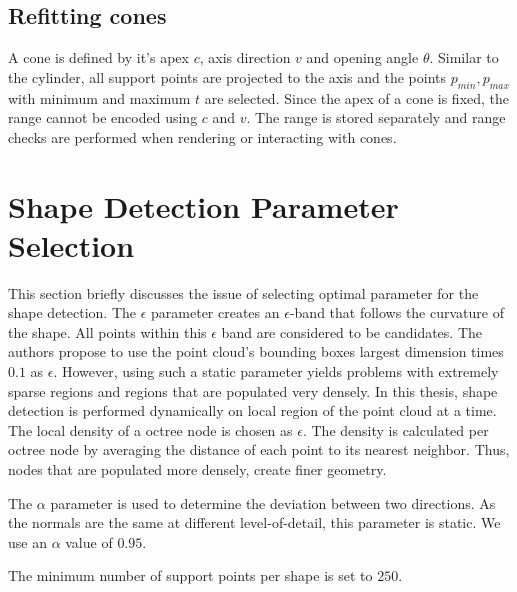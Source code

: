 \subsection{Refitting cones}

A cone is defined by it's apex $c$, axis direction $v$ and opening angle $\theta$. Similar to the cylinder, all support points are projected to the axis and the points $p_{min}, p_{max}$ with minimum and maximum $t$ are selected. Since the apex of a cone is fixed, the range cannot be encoded using $c$ and $v$. The range is stored separately and range checks are performed when rendering or interacting with cones. 


\section{Shape Detection Parameter Selection}
\label{sec:shapeDetectionParameterSelection}

This section briefly discusses the issue of selecting optimal parameter for the shape detection. The $\epsilon$ parameter creates an $\epsilon$-band that follows the curvature of the shape. All points within this $\epsilon$ band are considered to be candidates. The authors propose to use the point cloud's bounding boxes largest dimension times $0.1$ as $\epsilon$. However, using such a static parameter yields problems with extremely sparse regions and regions that are populated very densely. In this thesis, shape detection is performed dynamically on local region of the point cloud at a time. The local density of a octree node is chosen as $\epsilon$. The density is calculated per octree node by averaging the distance of each point to its nearest neighbor. Thus, nodes that are populated more densely, create finer geometry. 

The $\alpha$ parameter is used to determine the deviation between two directions. As the normals are the same at different level-of-detail, this parameter is static. We use an $\alpha$ value of $0.95$. 

The minimum number of support points per shape is set to $250$.